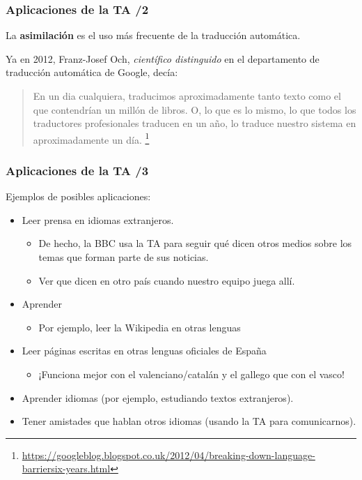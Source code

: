 \documentclass{beamer}
\begin{document}
\begin{frame}
\frametitle{Aplicaciones de la TA /2}

La \textbf{asimilación} es el uso más frecuente de la traducción automática.

Ya en 2012, Franz-Josef Och, \emph{científico distinguido} en el departamento de traducción automática de Google, decía:
\begin{quote}
En un dia cualquiera, traducimos aproximadamente tanto texto como el que contendrían un millón de libros. O, lo que es lo mismo, lo que todos los traductores profesionales traducen en un año, lo traduce nuestro sistema en aproximadamente un día.  \footnote{\url{https://googleblog.blogspot.co.uk/2012/04/breaking-down-language-barriersix-years.html}}
\end{quote} 


\end{frame}

\begin{frame}
\frametitle{Aplicaciones de la TA /3}
Ejemplos de posibles aplicaciones:
\begin{itemize}
\item Leer prensa en idiomas extranjeros.
\begin{itemize}
\item De hecho, la BBC usa la TA para seguir qué dicen otros medios sobre los temas que forman parte de sus noticias.
\item Ver que dicen en otro país cuando nuestro equipo juega allí.
\end{itemize}
\item Aprender
\begin{itemize}
\item Por ejemplo, leer la Wikipedia en otras lenguas
\end{itemize}
\item Leer páginas escritas en otras lenguas oficiales de España
\begin{itemize}
\item ¡Funciona mejor con el valenciano/catalán y el gallego que con el vasco!
\end{itemize}
\item Aprender idiomas (por ejemplo, estudiando textos extranjeros).
\item Tener amistades que hablan otros idiomas (usando la TA para comunicarnos).
\end{itemize}

\end{frame}
\end{document}
